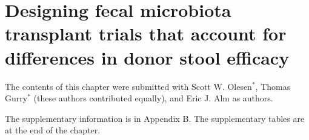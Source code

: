 \chapter{Designing fecal microbiota transplant trials that account for differences in donor stool efficacy}

The contents of this chapter were submitted with
Scott W. Olesen$^*$, Thomas Gurry$^*$ (these authors contributed equally), and Eric J. Alm as authors.

The supplementary information is in Appendix B.
The supplementary tables are at the end of the chapter.


